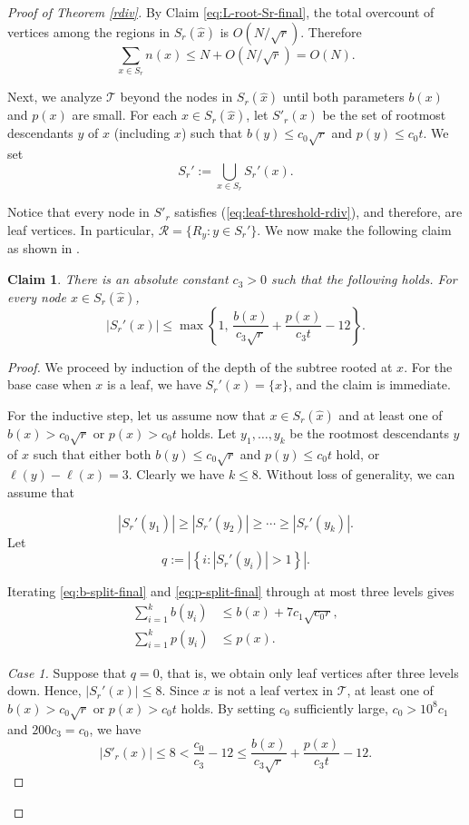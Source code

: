 \documentclass[11pt]{article}
\theoremstyle{plain}
\newtheorem{claim}[theorem]{Claim}
\theoremstyle{definition}
\theoremstyle{remark}
\begin{document}
\begin{proof}[Proof of Theorem \ref{rdiv}]
 
By Claim \ref{eq:L-root-Sr-final}, the total overcount of vertices among the regions in $S_r(\hat x)$ is $O(N/\sqrt{r})$.  Therefore
\[
\sum_{x\in S_r} n(x)\le N+ O(N/\sqrt{r}) = O(N).
\]
 
\noindent  Next, we analyze $\mathcal T$ beyond the nodes in $S_r(\hat x)$ until both parameters $b(x)$ and $p(x)$ are small.    For each $x \in S_r(\hat x)$, let $S'_r(x)$ be the set of rootmost descendants $y$ of $x$ (including $x$) such that $b(y) \leq c_0\sqrt{r}$ and $p(y) \leq c_0t$. 
We set
\[
S_r':=\bigcup_{x\in S_r} S_r'(x).
\]

\noindent Notice that every node in $S'_r$ satisfies (\ref{eq:leaf-threshold-rdiv}), and therefore, are leaf vertices.    In particular, $
\mathcal R=\{R_y:y\in S_r'\}.$  We now make the following claim as shown in \cite{KMS13}.


\begin{claim}\label{eq:phase2-claim-final}
There is an absolute constant $c_3 > 0$ such that the following holds. For every node $x \in S_r(\hat x)$,   
 $$|S_r'(x)|\le
\max\left\{
1,\,
\frac{b(x)}{c_3\sqrt r}+\frac{p(x)}{c_3t}-12
\right\}.$$
\end{claim}

 \begin{proof}
     
We proceed by induction of the depth of the  subtree rooted at \(x\).  For the base case when $x$ is a leaf, we have \(S_r'(x)=\{x\}\), and the claim is immediate.

For the inductive step, let us assume now that \(x\in S_r(\hat x)\) and at least one of \(b(x)>c_0\sqrt r\) or \(p(x)>c_0t\) holds.
Let \(y_1,\dots,y_k\) be the rootmost descendants \(y\) of \(x\) such that either both $
b(y)\le c_0\sqrt r$ and $p(y)\le c_0t$ hold, or $\ell(y)-\ell(x)=3.$  Clearly we have \(k\le 8\).  Without loss of generality, we can assume that 

\[
|S_r'(y_1)|\ge |S_r'(y_2)|\ge \cdots \ge |S_r'(y_k)|.
\]
Let
\[
q:=\left|\left\{i: |S_r'(y_i)|>1\right\}\right|.
\]

\noindent Iterating
\eqref{eq:b-split-final} and \eqref{eq:p-split-final} through at most three levels gives
\begin{align}
\sum_{i=1}^k b(y_i) &\le b(x)+7c_1\sqrt{c_0r}, \label{eq:sum-b-yi-final}\\
\sum_{i=1}^k p(y_i) &\le p(x). \label{eq:sum-p-yi-final}
\end{align}

\noindent \emph{Case 1.}  Suppose that $q = 0$, that is, we obtain only leaf vertices after three levels down.  Hence, \(|S_r'(x)|\le 8\). Since \(x\) is not a leaf vertex in $\mathcal T$, at least one of \(b(x)>c_0\sqrt r\) or
\(p(x)>c_0t\) holds.  By setting $c_0$ sufficiently large, $c_0 > 10^8c_1$ and $200c_3 = c_0$, we have
\[
|S'_r(x)|
\le 8
<
\frac{c_0}{c_3}-12
\le
\frac{b(x)}{c_3\sqrt r}+\frac{p(x)}{c_3t}-12.
\]




\end{proof}
\end{proof}
\end{document}
